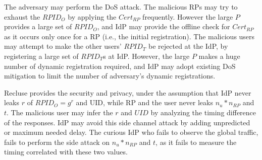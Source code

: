  The adversary may perform the DoS attack. The malicious RPs may try to exhaust the $RPID_O$  by applying the $Cert_{RP}$ frequently. However the large $P$ provides a large set of $RPID_O$, and IdP may provide the offline check for $Cert_{RP}$ as it occurs only once for a RP (i.e., the initial registration). The malicious users may attempt to make the other users' $RPID_T$ be rejected at the IdP, by registering a large set of $RPID_T$s at IdP. However, the large $P$ makes a huge number of dynamic registration required, and IdP may adopt existing DoS mitigation  to limit the number of adversary's dynamic registrations. 

 Recluse provides the security and privacy, under the assumption that IdP never leaks $r$ of $RPID_O=g^r$ and UID, while RP and the user never leaks $n_u*n_{RP}$ and $t$. The malicious user may infer the $r$ and $UID$ by analyzing the timing difference of the responses. IdP may avoid this side channel attack by adding unpredicted or maximum needed delay. The curious IdP who fails to observe the global traffic, fails to perform the side attack on $n_u*n_{RP}$ and $t$, as it fails to measure the timing correlated with these two values.
